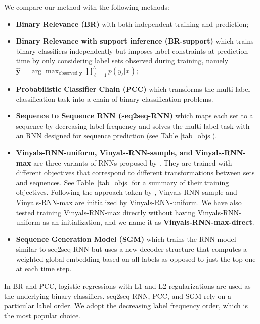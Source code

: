 We compare our method with the following methods: 
\begin{itemize}
	\item \textbf{Binary Relevance (BR)} \cite{tsoumakas2007multi} with both independent training and prediction;
	\item \textbf{Binary Relevance with support inference (BR-support)} \cite{wang2017regularizing} which trains binary classifiers independently but imposes label constraints at prediction time by only considering label sets observed during training, namely $\hat{\mathbf{y}}=\arg\max_{\text{observed~}\mathbf{y}}\prod_{\ell=1}^L p(y_{\ell}|x)$;
	\item \textbf{Probabilistic Classifier Chain (PCC)} \cite{read2009classifier} which transforms the multi-label classification task into a chain of binary classification problems.
    \item \textbf{Sequence to Sequence RNN (seq2seq-RNN)} \cite{DBLP:conf/nips/NamMKF17} which maps each set to a sequence by decreasing label frequency and solves the multi-label task with an RNN designed for sequence prediction (see Table \ref{tab_objs}). 
    \item \textbf{Vinyals-RNN-uniform, Vinyals-RNN-sample, and Vinyals-RNN-max} are three variants of RNNs proposed by \cite{vinyals2015order}. They are trained  with different objectives that correspond to different transformations between sets and sequences. See Table~\ref{tab_objs} for a summary of their training objectives. Following the approach taken by \cite{vinyals2015order}, Vinyals-RNN-sample and Vinyals-RNN-max are initialized by Vinyals-RNN-uniform. We have also tested training Vinyals-RNN-max directly without having Vinyals-RNN-uniform as an initialization, and we name it as  \textbf{Vinyals-RNN-max-direct}.
    \item \textbf{Sequence Generation Model (SGM)} \cite{DBLP:journals/corr/abs-1806-04822} which trains the RNN model similar to seq2seq-RNN but uses a new decoder structure that computes a weighted global embedding based on all labels as opposed to just the top one at each time step.
\end{itemize}

In BR and PCC, logistic regressions with L1 and L2 regularizations are used as the underlying binary classifiers. seq2seq-RNN, PCC, and SGM rely on a particular label order. We adopt the decreasing label frequency order, which is the most popular choice.


